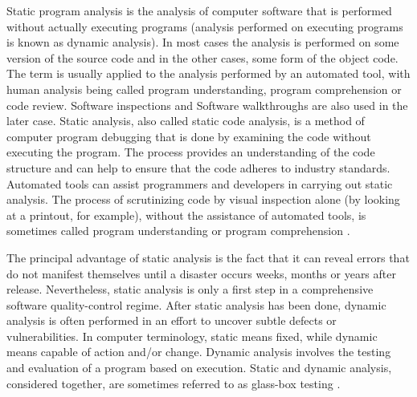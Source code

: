 Static program analysis is the analysis of computer software that is performed without actually executing programs (analysis performed on executing programs is known as dynamic analysis). In most cases the analysis is performed on some version of the source code and in the other cases, some form of the object code. The term is usually applied to the analysis performed by an automated tool, with human analysis being called program understanding, program comprehension or code review. Software inspections and Software walkthroughs are also used in the later case. Static analysis, also called static code analysis, is a method of computer program debugging that is done by examining the code without executing the program. The process provides an understanding of the code structure and can help to ensure that the code adheres to industry standards. Automated tools can assist programmers and developers in carrying out static analysis. The process of scrutinizing code by visual inspection alone (by looking at a printout, for example), without the assistance of automated tools, is sometimes called program understanding or program comprehension \cite{ref_86_techtarget:techtarget}.

The principal advantage of static analysis is the fact that it can reveal errors that do not manifest themselves until a disaster occurs weeks, months or years after release. Nevertheless, static analysis is only a first step in a comprehensive software quality-control regime. After static analysis has been done, dynamic analysis is often performed in an effort to uncover subtle defects or vulnerabilities. In computer terminology, static means fixed, while dynamic means capable of action and/or change. Dynamic analysis involves the testing and evaluation of a program based on execution. Static and dynamic analysis, considered together, are sometimes referred to as glass-box testing \cite{ref_86_techtarget:techtarget}.

